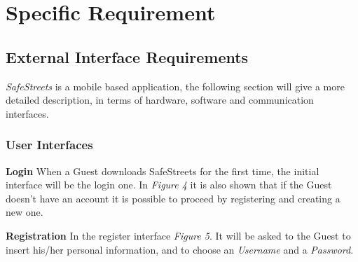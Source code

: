\section{Specific Requirement}

\subsection{External Interface Requirements}
\textit{SafeStreets} is a mobile based application, the following section will give a more detailed description, in terms of hardware, software and communication interfaces.
\subsubsection{User Interfaces}
    \textbf{Login} \newline When a Guest downloads SafeStreets for the first time, the initial interface will be the login one. In \textit{Figure 4} it is also shown that if the Guest doesn't have an account it is possible to proceed by registering and creating a new one.\vspace{0.3cm}
    
    \noindent\textbf{Registration}\newline
    In the register interface \textit{Figure 5}. It will be asked to the Guest to insert his/her personal information, and to choose an \textit{Username} and a \textit{Password}.\vspace{0.7cm}
    
